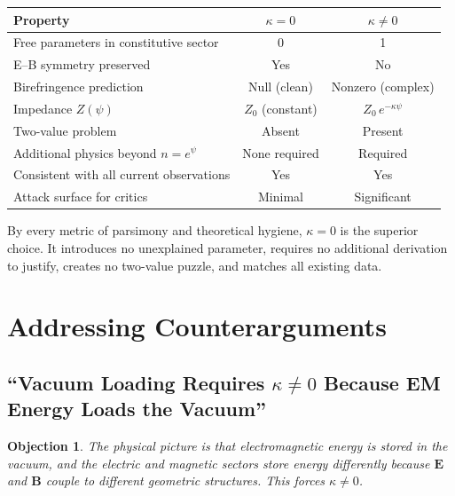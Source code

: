 \documentclass[12pt,a4paper]{article}
\newtheorem{objection}{Objection}
\theoremstyle{definition}
\theoremstyle{remark}
\newcommand{\vE}{\mathbf{E}}
\newcommand{\vB}{\mathbf{B}}
\begin{document}
\begin{center}
\renewcommand{\arraystretch}{1.3}
\begin{tabular}{lcc}
\toprule
\textbf{Property} & $\kappa = 0$ & $\kappa \neq 0$ \\
\midrule
Free parameters in constitutive sector & 0 & 1 \\
E--B symmetry preserved & Yes & No \\
Birefringence prediction & Null (clean) & Nonzero (complex) \\
Impedance $Z(\psi)$ & $Z_0$ (constant) & $Z_0\, e^{-\kappa\psi}$ \\
Two-value problem & Absent & Present \\
Additional physics beyond $n = e^\psi$ & None required & Required \\
Consistent with all current observations & Yes & Yes \\
Attack surface for critics & Minimal & Significant \\
\bottomrule
\end{tabular}
\end{center}

By every metric of parsimony and theoretical hygiene, $\kappa = 0$ is
the superior choice.  It introduces no unexplained parameter, requires
no additional derivation to justify, creates no two-value puzzle, and
matches all existing data.

\section{Addressing Counterarguments}
\label{sec:counterarguments}

\subsection{``Vacuum Loading Requires $\kappa \neq 0$ Because EM Energy
  Loads the Vacuum''}

\begin{objection}
The physical picture is that electromagnetic energy is stored in the
vacuum, and the electric and magnetic sectors store energy differently
because $\vE$ and $\vB$ couple to different geometric structures.
This forces $\kappa \neq 0$.
\end{objection}
\end{document}
